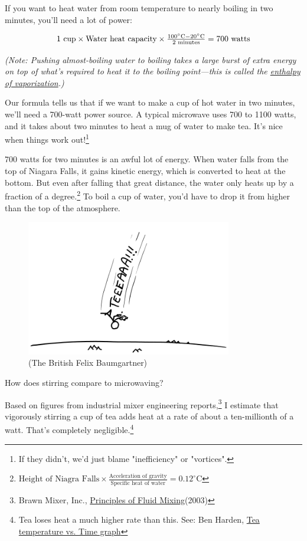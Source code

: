 {{If you want to heat water from room temperature to nearly boiling in two minutes, you'll need a lot of power:}

{\[1\text{ cup}\times\text{Water heat capacity}\times\tfrac{100^\circ\rm{C}-20^\circ\rm{C}}{2\text{ minutes}}=700\text{ watts}\]}

{ \emph{(Note: Pushing almost-boiling water to boiling takes a large burst of extra energy on top of what's required to heat it to the boiling point—this is called the \href{https://en.wikipedia.org/wiki/Enthalpy\_of\_vaporization}{enthalpy of vaporization}.)} }

{Our formula tells us that if we want to make a cup of hot water in two minutes, we'll need a 700-watt power source. A typical microwave uses 700 to 1100 watts, and it takes about two minutes to heat a mug of water to make tea. It's nice when things work out!{\footnote{If they didn't, we'd just blame "inefficiency" or "vortices".} } }

{700 watts for two minutes is an awful lot of energy. When water falls from the top of Niagara Falls, it gains kinetic energy, which is converted to heat at the bottom. But even after falling that great distance, the water only heats up by a fraction of a degree.{\footnote{\(\text{Height of Niagra Falls}\times\frac{\text{Acceleration of gravity}}{\text{Specific heat of water}}=0.12^\circ\text{C}\)} } To boil a cup of water, you'd have to drop it from higher than the top of the atmosphere.}

\begin{figure}[!htbp]
\centering
\includegraphics[scale=0.5, max width=0.8\textwidth]{imgs/a/71/tea_jump.png}
\caption{(The British Felix Baumgartner)}
\end{figure}

{How does stirring compare to microwaving?}

{Based on figures from industrial mixer engineering reports,{\footnote{Brawn Mixer, Inc., \href{http://www.craneengineering.net/products/mixers/documents/craneEngineeringPrinciplesOfFluidMixing.pdf}{Principles of Fluid Mixing}(2003)} } I estimate that vigorously stirring a cup of tea adds heat at a rate of about a ten-millionth of a watt. That's completely negligible.{\footnote{Tea loses heat a much higher rate than this. See: Ben Harden, \href{http://www.whoi.edu/vanishingarctic/page.do?pid=48597&tid=441&cid=120786&ct=61&article=82910} {Tea temperature vs. Time graph}} } }

}
